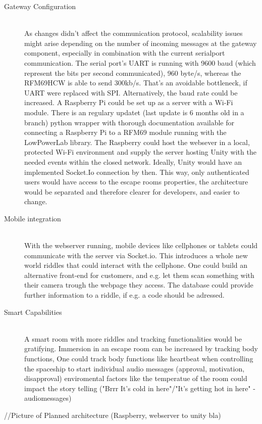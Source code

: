 \begin{description}
    \item[Gateway Configuration]\hfill \\
    As changes didn't affect the communication protocol, scalability issues might arise depending on the number of incoming messages at the gateway component, 
    especially in combination with the current serialport communication. 
    The serial port's UART is running with 9600 baud (which represent the bits per second communicated), 
    960 byte/s, whereas the RFM69HCW is able to send 300kb/s. 
    That's an avoidable bottleneck, if UART were replaced with SPI.
    Alternatively, the baud rate could be increased.
    A Raspberry Pi could be set up as a server with a Wi-Fi module. 
    There is an regulary updatet (last update is 6 months old in a branch) python wrapper \parencite{raspberrypiLibRFM} with thorough documentation \parencite{raspberrypiDoc} available for connecting 
    a Raspberry Pi to a RFM69 module running with the LowPowerLab library. 
    The Raspberry could host the websever in a local, protected Wi-Fi environment and 
    supply the server hosting Unity with the needed events within the closed network. 
    Ideally, Unity would have an implemented Socket.Io connection by then.
    This way, only authenticated users would have access to the escape rooms properties, 
    the architecture would be separated and therefore clearer for developers, and easier to change.
     \parencite{raspberrypiDoc}
     \item[Mobile integration]\hfill \\
     With the webserver running, mobile devices like cellphones or tablets could communicate with the server via Socket.io. 
     This introduces a whole new world riddles that could interact with the cellphone. 
     One could build an alternative front-end for customers, and e.g.
     let them scan something with their camera trough the webpage they access.
     The database could provide further information to a riddle, if e.g. a code should be adressed.
     \item[Smart Capabilities]\hfill \\
     A smart room with more riddles and tracking functionalities would be gratifying.
     Immersion in an escape room can be increased by tracking body functions,
     One could track body functions like heartbeat when controlling 
     the spaceship to start individual audio messages (approval, motivation, disapproval)
     enviromental factors like the temperatue of the room could impact the story telling ("Brrr It's cold in here"/"It's getting hot in here" - audiomessages)


\end{description}
//Picture of Planned architecture (Raspberry, webserver to unity bla)


